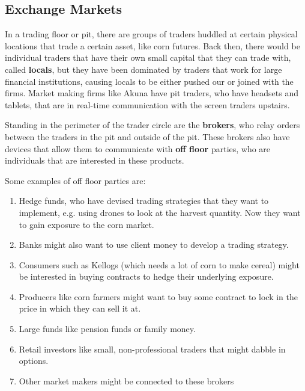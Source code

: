 \documentclass{article}
\begin{document}
  \subsection{Exchange Markets}

    In a trading floor or pit, there are groups of traders huddled at certain physical locations that trade a certain asset, like corn futures. Back then, there would be individual traders that have their own small capital that they can trade with, called \textbf{locals}, but they have been dominated by traders that work for large financial institutions, causing locals to be either pushed our or joined with the firms. Market making firms like Akuna have pit traders, who have headsets and tablets, that are in real-time communication with the screen traders upstairs. 

    Standing in the perimeter of the trader circle are the \textbf{brokers}, who relay orders between the traders in the pit and outside of the pit. These brokers also have devices that allow them to communicate with \textbf{off floor} parties, who are individuals that are interested in these products. 

    \begin{example}
      Some examples of off floor parties are: 
      \begin{enumerate}
        \item Hedge funds, who have devised trading strategies that they want to implement, e.g. using drones to look at the harvest quantity. Now they want to gain exposure to the corn market. 
        \item Banks might also want to use client money to develop a trading strategy. 
        \item Consumers such as Kellogs (which needs a lot of corn to make cereal) might be interested in buying contracts to hedge their underlying exposure. 
        \item Producers like corn farmers might want to buy some contract to lock in the price in which they can sell it at. 
        \item Large funds like pension funds or family money. 
        \item Retail investors like small, non-professional traders that might dabble in options.  
        \item Other market makers might be connected to these brokers
      \end{enumerate}
    \end{example}
\end{document}
